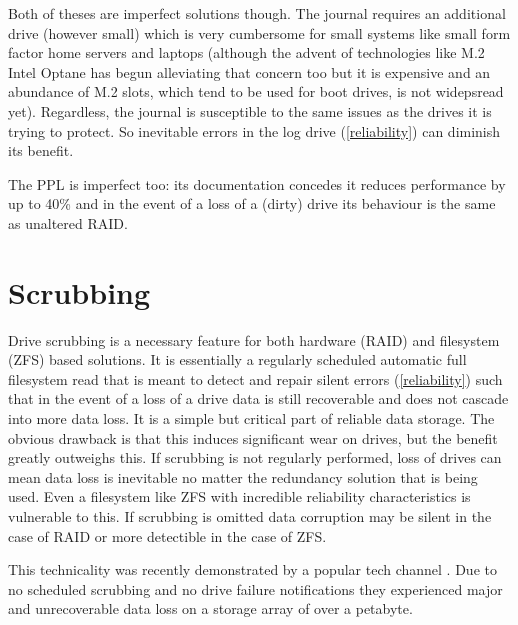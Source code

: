         Both of theses are imperfect solutions though. The journal requires an
        additional drive (however small) which is very cumbersome for small
        systems like small form factor home servers and laptops (although the
        advent of technologies like M.2 Intel Optane \cite{Optane_homepage} has
        begun alleviating that concern too but it is expensive and an abundance
        of M.2 slots, which tend to be used for boot drives, is not widepsread
        yet). Regardless, the journal is susceptible to the same issues as the
        drives it is trying to protect.  So inevitable errors in the log drive
        (\ref{reliability}) can diminish its benefit.

        The PPL is imperfect too: its documentation \cite{PPL} concedes it
        reduces performance by up to 40\% and in the event of a loss of a
        (dirty) drive its behaviour is the same as unaltered RAID.

    \section{Scrubbing}

        Drive scrubbing is a necessary feature for both hardware (RAID) and
        filesystem (ZFS) based solutions. It is essentially a regularly
        scheduled automatic full filesystem read that is meant to detect and
        repair silent errors (\ref{reliability}) such that in the event of a
        loss of a drive data is still recoverable and does not cascade into
        more data loss. It is a simple but critical part of reliable data
        storage. The obvious drawback is that this induces significant wear on
        drives, but the benefit greatly outweighs this. If scrubbing is not
        regularly performed, loss of drives can mean data loss is inevitable no
        matter the redundancy solution that is being used. Even a filesystem
        like ZFS with incredible reliability characteristics
        \cite{ZFS_reliability} is vulnerable to this. If scrubbing is omitted
        data corruption may be silent in the case of RAID or more detectible in
        the case of ZFS.

        This technicality was recently demonstrated by a popular tech channel
        \cite{LTT_data_loss}. Due to no scheduled scrubbing and no drive
        failure notifications they experienced major and unrecoverable data
        loss on a storage array of over a petabyte.

